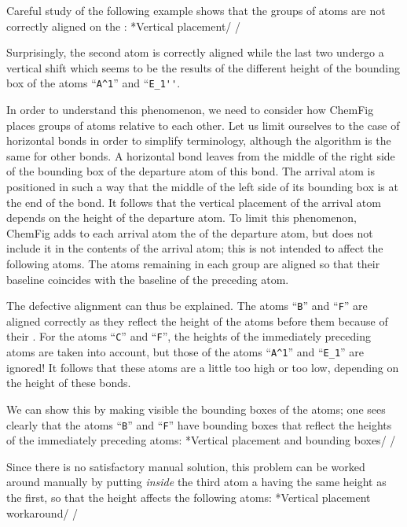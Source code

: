 \documentclass[10pt]{article}
\makeatletter
\newcommand\idx{\@ifstar{\let\print@or@not\@gobble\idx@}{\let\print@or@not\@firstofone\idx@}}
\newcommand\idx@[1]{%
	\ifcat\expandafter\noexpand\@car#1\@nil\relax%
		\expandafter\ifx\@car#1\@nil\protect
			\index{#1}%
			\print@or@not{#1}%
		\else
			\saveexpandmode\expandarg
			\StrSubstitute{\string#1}{\string @}{\@empty\protect\symbol{'100}}[\temp@]%
			\StrGobbleLeft\temp@1[\temp@]%
			\restoreexpandmode
			\expandafter\index\expandafter{\temp@ @\protect\texttt{\protect\textbackslash\temp@}}%
			\print@or@not{\texttt{\string#1}}%
		\fi
	\else
		\index{#1}%
		\print@or@not{#1}%
	\fi
}
\newcommand\make@car@active[1]{%
	\catcode`#1\active
	\begingroup
		\lccode`\~`#1\relax
		\lowercase{\endgroup\def~}%
}
\newif\if@exstar
\newcommand\exemple{%
	\begingroup
	\parskip\z@
	\@makeother\;\@makeother\!\@makeother\?\@makeother\:%
	\@ifstar{\@exstartrue\exemple@}{\@exstarfalse\exemple@}}
\newcommand\exemple@[2][65]{%
	\medbreak\noindent
	\begingroup
		\let\do\@makeother\dospecials
		\make@car@active\ { {}}%
		\make@car@active\^^M{\par\leavevmode}%
		\make@car@active\,{\leavevmode\kern\z@\string,}%
		\make@car@active\-{\leavevmode\kern\z@\string-}%
		\make@car@active\>{\leavevmode\kern\z@\string>}%
		\make@car@active\<{\leavevmode\kern\z@\string<}%
		\exemple@@{#1}{#2}%
}
\newcommand\exemple@@[3]{%
	\def\@tempa##1#3{\exemple@@@{#1}{#2}{##1}}%
	\@tempa
}
\newcommand\exemple@@@[3]{%
	\xdef\the@code{#3}%
	\endgroup
	\if@exstar
		\begingroup
			\fboxrule0.4pt
			\let\breakboxparindent\z@
			\def\bkvz@bottom{\hrule\@height\fboxrule}%
			\let\bkvz@before@breakbox\relax
			\def\bkvz@set@linewidth{\advance\linewidth\dimexpr-2\fboxrule-2\fboxsep}%
			\def\bkvz@left{\vrule\@width\fboxrule\hskip\fboxsep}%
			\def\bkvz@right{\hskip\fboxsep\vrule\@width\fboxrule}%
			\def\bkvz@top{\hbox to \hsize{%
				\vrule\@width\fboxrule\@height\fboxrule
				\leaders\bkvz@bottom\hfill
				\ECFAugie
				\fboxsep\z@
				\colorbox{black}{\kern0.25em\color{white}\footnotesize\lower0.5ex\hbox{\strut#2}\kern0.25em}%
				\leaders\bkvz@bottom\hfill
				\vrule\@width\fboxrule\@height\fboxrule}}%
			\breakbox
				\kern.5ex\relax
				\ttfamily\footnotesize\the@code\par
				\normalfont
				\kern3pt
				\hrule height0.1pt width\linewidth depth0.1pt
				\vskip5pt
				\rightskip0pt plus 1fill
				\everypar{{\color{lightgray}\rlap{\vrule height0.1pt width\linewidth depth0.1pt}}\hskip0pt plus 1fill}%
				\newlinechar`\^^M\everyeof{\noexpand}\scantokens{#3}\par
			\endbreakbox
		\endgroup
	\else
		\vskip0.5ex
		\boxput*(0,1)
			{\fboxsep\z@
			\hbox{\ECFAugie\colorbox{black}{\leavevmode\kern0.25em{\color{white}\footnotesize\strut#2}\kern0.25em}}%
			}%
			{\fboxsep5pt
			\fbox{%
				$\vcenter{\hsize\dimexpr0.#1\linewidth-\fboxsep-\fboxrule\relax
					\kern5pt\parskip0pt \ttfamily\footnotesize\the@code}%
				\vcenter{\kern5pt\hsize\dimexpr\linewidth-0.#1\linewidth-\fboxsep-\fboxrule\relax
					\everypar{{\color{lightgray}\rlap{\vrule height0.1pt width\dimexpr\linewidth-0.#1\linewidth-\fboxsep-\fboxrule depth0.1pt}}}%
					\footnotesize\newlinechar`\^^M\everyeof{\noexpand}\scantokens{#3}}$%
				}%
			}%
	\fi
	\medbreak
	\endgroup
}
\let\do\@makeother\dospecials
\newcommand\CF{{\ECFAugie ChemFig}\xspace}
\makeatother
\begin{document}
Careful study of the following example shows that the groups of atoms are not correctly aligned on the \idx{baseline}:
\exemple*{Vertical placement}/\Huge\setatomsep{2em}
\qquad
{}/

Surprisingly, the second atom is correctly aligned while the last two undergo a vertical shift which seems to be the results of the different height of the bounding box of the atoms ``\verb-A^1-'' and ``\verb-E_1''-.

In order to understand this phenomenon, we need to consider how \CF places groups of atoms relative to each other. Let us limit ourselves to the case of horizontal bonds in order to simplify terminology, although the algorithm is the same for other bonds. A horizontal bond leaves from the middle of the right side of the bounding box of the departure atom of this bond. The arrival atom is positioned in such a way that the middle of the left side of its bounding box is at the end of the bond. It follows that the vertical placement of the arrival atom depends on the height of the departure atom. To limit this phenomenon, \CF adds to each arrival atom the \idx{\vphantom} of the departure atom, but does not include it in the contents of the arrival atom; this \idx{\vphantom} is not intended to affect the following atoms. The atoms remaining in each group are aligned so that their baseline coincides with the baseline of the preceding atom.

The defective alignment can thus be explained. The atoms ``\verb-B-'' and ``\verb-F-'' are aligned correctly as they reflect the height of the atoms before them because of their \idx{\vphantom}. For the atoms ``\verb-C-'' and ``\verb-F-'', the heights of the immediately preceding atoms are taken into account, but those of the atoms ``\verb-A^1-'' and ``\verb-E_1-'' are ignored! It follows that these atoms are a little too high or too low, depending on the height of these bonds.

We can show this by making visible the bounding boxes of the atoms; one sees clearly that the atoms ``\verb-B-'' and ``\verb-F-'' have bounding boxes that reflect the heights of the immediately preceding atoms:
\exemple*{Vertical placement and bounding boxes}/\Huge\setatomsep{2em}
\fboxsep=0pt
\renewcommand\printatom[1]{\fbox{\ensuremath{\mathrm#1}}}
\qquad
{}/

Since there is no satisfactory manual solution, this problem can be worked around manually by putting \emph{inside} the third atom a \idx{\vphantom} having the same height as the first, so that the height affects the following atoms:
\exemple*{Vertical placement workaround}/\Huge\setatomsep{2em}
\qquad
{}/
\end{document}
